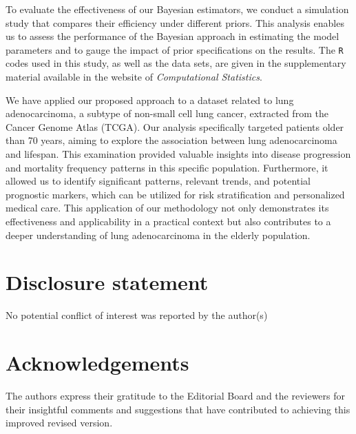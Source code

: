 \documentclass[]{interact}
\theoremstyle{plain}%
\theoremstyle{definition}
\theoremstyle{remark}
\begin{document}
{\color{black}
To evaluate the effectiveness of our Bayesian estimators, we conduct a simulation study that compares their efficiency under different priors. This analysis enables us to assess the performance of the Bayesian approach in estimating the model parameters and to gauge the impact of prior specifications on the results. The \texttt{R} codes used in this study, as well as the data sets, are given in the supplementary
material available in the website of {\it Computational Statistics}.
}

We have applied our proposed approach to a dataset related to lung adenocarcinoma, a subtype of non-small cell lung cancer, extracted from the Cancer Genome Atlas (TCGA). Our analysis specifically targeted patients older than 70 years, aiming to explore the association between lung adenocarcinoma and lifespan. This examination provided valuable insights into disease progression and mortality frequency patterns in this specific population. Furthermore, it allowed us to identify significant patterns, relevant trends, and potential prognostic markers, which can be utilized for risk stratification and personalized medical care. This application of our methodology not only demonstrates its effectiveness and applicability in a practical context but also contributes to a deeper understanding of lung adenocarcinoma in the elderly population.


\section*{Disclosure statement}

No potential conflict of interest was reported by the author(s)



\section*{Acknowledgements}


The authors express their gratitude to the Editorial Board and the reviewers for their insightful comments and suggestions that have contributed to achieving this improved revised version.
\end{document}
